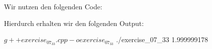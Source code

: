 \section{}

Wir nutzen den folgenden Code:



Hierdurch erhalten wir den folgenden Output:

\begin{consoleoutput}
$ g++ exercise_07_33.cpp -o exercise_07_33
$ ./exercise_07_33 
1.999999178
\end{consoleoutput}
